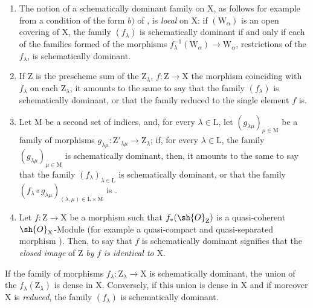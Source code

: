 \begin{remarks}[11.10.3]
\label{IV.11.10.3}
\medskip\noindent
\begin{enumerate}[label=(\roman*)]
  \item The notion of a schematically dominant family on $\mathrm{X}$, as follows for example from a condition of the form $b)$ of , is \emph{local} on $\mathrm{X}$: if $(\mathrm{W}_\alpha)$ is an open covering of $\mathrm{X}$, the family $(f_\lambda)$ is schematically dominant if and only if each of the families formed of the morphisms $f_\lambda^{-1}(\mathrm{W}_\alpha)\to\mathrm{W}_\alpha$, restrictions of the $f_\lambda$, is schematically dominant.
  \item If $\mathrm{Z}$ is the prescheme sum of the $\mathrm{Z}_\lambda$, $f:\mathrm{Z}\to\mathrm{X}$ the morphism coinciding with $f_\lambda$ on each $\mathrm{Z}_\lambda$, it amounts to the same to say that the family $(f_\lambda)$ is schematically dominant, or that the family reduced to the single element $f$ is.
  \item Let $\mathrm{M}$ be a second set of indices, and, for every $\lambda\in\mathrm{L}$, let $(g_{\lambda\mu})_{\mu\in\mathrm{M}}$ be a family of morphisms $g_{\lambda\mu}:\mathrm{Z}'_{\lambda\mu}\to\mathrm{Z}_\lambda$; if, for every $\lambda\in\mathrm{L}$, the family $(g_{\lambda\mu})_{\mu\in\mathrm{M}}$ is schematically dominant, then, it amounts to the same to say that the family $(f_\lambda)_{\lambda\in\mathrm{L}}$ is schematically dominant, or that the family $(f_\lambda\circ g_{\lambda\mu})_{(\lambda,\mu)\in\mathrm{L}\times\mathrm{M}}$ is .
  \item Let $f:\mathrm{Z}\to\mathrm{X}$ be a morphism such that $f_*(\sh{O}_\mathrm{Z})$ is a quasi-coherent $\sh{O}_\mathrm{X}$-Module (for example a quasi-compact and quasi-separated morphism ).
  Then, to say that $f$ is schematically dominant signifies that the \emph{closed image} of $\mathrm{Z}$ \emph{by} $f$  \emph{is identical to} $\mathrm{X}$.
\end{enumerate}
\end{remarks}

\begin{proposition}[11.10.4]
\label{IV.11.10.4}
If the family of morphisms $f_\lambda:\mathrm{Z}_\lambda\to\mathrm{X}$ is schematically dominant, the union of the $f_\lambda(\mathrm{Z}_\lambda)$ is dense in $\mathrm{X}$.
Conversely, if this union is dense in $\mathrm{X}$ and if moreover $\mathrm{X}$ is \emph{reduced}, the family $(f_\lambda)$ is schematically dominant.
\end{proposition}


